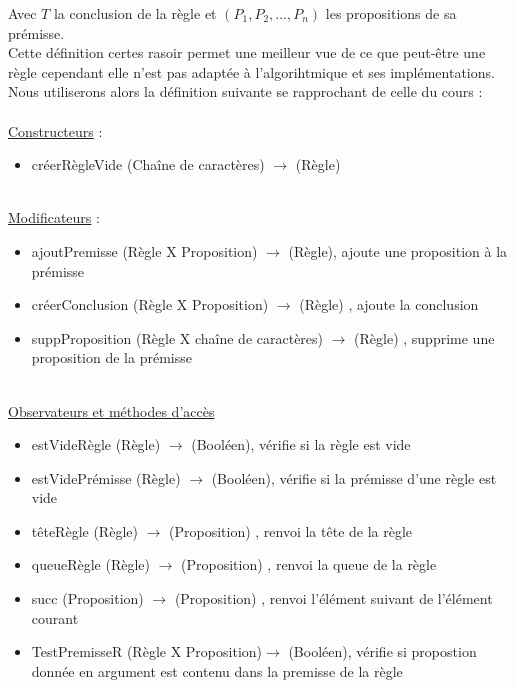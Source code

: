 \documentclass{article}
\begin{document}
Avec $T$ la conclusion de la règle et $(P_1,P_2,...,P_n)$ les propositions de sa prémisse.\\


Cette définition certes rasoir permet une meilleur vue de ce que peut-être une règle cependant elle n'est pas adaptée à l'algorihtmique et ses implémentations.\\
Nous utiliserons alors la définition suivante se rapprochant de celle du cours : \\
\\
\underline{Constructeurs} :

\begin{itemize}
    \item créerRègleVide (Chaîne de caractères) $\longrightarrow$ (Règle)
\end{itemize}
\\
\underline{Modificateurs} :
\\

\begin{itemize}
    \item ajoutPremisse (Règle X Proposition) $\longrightarrow$ (Règle), ajoute une proposition à la prémisse
    \item créerConclusion (Règle X Proposition) $\longrightarrow$ (Règle) , ajoute la conclusion
    \item suppProposition (Règle X chaîne de caractères) $\longrightarrow$ (Règle) , supprime une proposition de la prémisse
\end{itemize}\\
\underline{Observateurs et méthodes d'accès}
\begin{itemize}
    \item estVideRègle (Règle) $\longrightarrow$ (Booléen), vérifie si la règle est vide
    \item estVidePrémisse (Règle) $\longrightarrow$ (Booléen), vérifie si la prémisse d'une règle est vide
    \item têteRègle (Règle) $\longrightarrow$ (Proposition) , renvoi la tête de la règle
    \item queueRègle (Règle) $\longrightarrow$ (Proposition) , renvoi la queue de la règle
    \item succ (Proposition) $\longrightarrow$ (Proposition) , renvoi l'élément suivant de l'élément courant
    \item TestPremisseR (Règle X Proposition)$\longrightarrow$ (Booléen), vérifie si propostion donnée en argument est contenu dans la premisse de la règle
\end{itemize}
\end{document}
